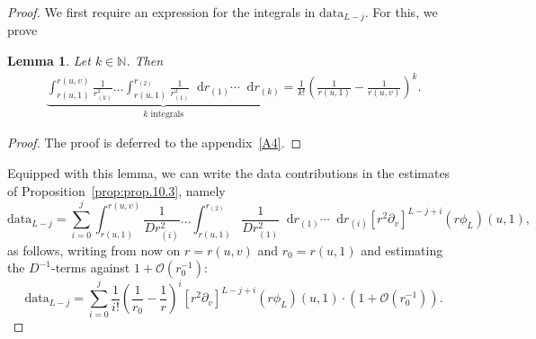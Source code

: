 \documentclass[11pt,english]{article}
\numberwithin{equation}{section}
\newtheorem{lemma}{Lemma}[section]
\theoremstyle{remark}
\theoremstyle{plain}
\theoremstyle{remark}
\newcommand{\dd}{\mathop{}\!\mathrm{d}}
\newcommand{\pv}{\partial_v}
\renewcommand{\(}{\left(}
\renewcommand{\)}{\right)}
\begin{document}
\begin{proof}
We first require an expression for the integrals in $\mathrm{data}_{L-j}$. For this, we prove
\begin{lemma}\label{lem10.2}Let $k\in\mathbb N$. Then
\begin{align}
\underbrace{\int_{r(u,1)}^{r(u,v)}\frac{1}{r_{(k)}^2}\dots\int_{r(u,1)}^{r_{(2)}}\frac{1}{r_{(1)}^2}\dd r_{(1)}\cdots\dd r_{(k)}}_{k\text{ integrals}}=\frac{1}{k!}\left(\frac{1}{r(u,1)}-\frac{1}{r(u,v)}\right)^k.
\end{align}
\end{lemma}
\begin{proof}
The proof is deferred to  the appendix~\ref{A4}.
\end{proof}
Equipped with this lemma, we can write the data contributions in the estimates of Proposition~\ref{prop:prop.10.3}, namely
\begin{equation}
\mathrm{data}_{L-j}=\sum_{i=0}^j 
\int_{r(u,1)}^{r(u,v)}\frac{1}{Dr_{(i)}^2}\dots\int_{r(u,1)}^{r_{(2)}}\frac{1}{Dr_{(1)}^2}\dd r_{(1)}\cdots\dd r_{(i)}[r^2\pv]^{L-j+i}(r\phi_L)(u,1),
\end{equation}
as follows, writing from now on $r=r(u,v)$ and $r_0=r(u,1)$ and estimating the $D^{-1}$-terms against $1+\mathcal O(r_0^{-1})$:
\begin{equation}
\mathrm{data}_{L-j}=\sum_{i=0}^j \frac{1}{i!}\left(\frac{1}{r_0}-\frac{1}{r}\right)^i	 [r^2\pv]^{L-j+i}(r\phi_L)(u,1)\cdot\left(1+\mathcal{O}(r_0^{-1})\right).
\end{equation}


\end{proof}
\end{document}
